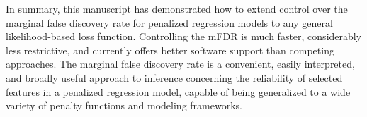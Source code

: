 In summary, this manuscript has demonstrated how to extend control over the marginal false discovery rate for penalized regression models to any general likelihood-based loss function.  Controlling the mFDR is much faster, considerably less restrictive, and currently offers better software support than competing approaches.  The marginal false discovery rate is a convenient, easily interpreted, and broadly useful approach to inference concerning the reliability of selected features in a penalized regression model, capable of being generalized to a wide variety of penalty functions and modeling frameworks.
